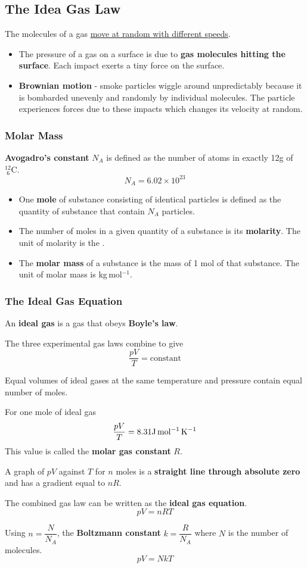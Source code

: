 \subsection{The Idea Gas Law}

The molecules of a gas \underline{move at random with different speeds}.
\begin{itemize}
    \item The pressure of a gas on a surface is due to \textbf{gas molecules hitting the surface}. Each impact exerts a tiny force on the surface.
    \item \textbf{Brownian motion} - smoke particles wiggle around unpredictably because it is bombarded unevenly and randomly by individual molecules. The particle experiences forces due to these impacts which changes its velocity at random.
\end{itemize}

\subsubsection*{Molar Mass}

\textbf{Avogadro's constant} $N_A$ is defined as the number of atoms in exactly 12g of $^{12}_{\hspace{4pt}6}\text{C}$.
$$N_A=6.02\times10^{23}$$

\begin{itemize}
    \item One \textbf{mole} of substance consisting of identical particles is defined as the quantity of substance that contain $N_A$ particles.
    \item The number of moles in a given quantity of a substance is its \textbf{molarity}. The unit of molarity is the .
    \item The \textbf{molar mass} of a substance is the mass of 1 mol of that substance. The unit of molar mass is kg\,mol$^{-1}$.
\end{itemize}

\subsubsection*{The Ideal Gas Equation}

An \textbf{ideal gas} is a gas that obeys \textbf{Boyle's law}.

The three experimental gas laws combine to give
$$\frac{pV}{T}=\text{constant}$$

Equal volumes of ideal gases at the same temperature and pressure contain equal number of moles.

For one mole of ideal gas
$$\frac{pV}{T}=8.31\text{J\,mol$^{-1}$\,K$^{-1}$}$$
This value is called the \textbf{molar gas constant} $R$.

A graph of $pV$ against $T$ for $n$ moles is a \textbf{straight line through absolute zero} and has a gradient equal to $nR$.

The combined gas law can be written as the \textbf{ideal gas equation}.
$$pV=nRT$$

Using $n=\dfrac{N}{N_A}$, the \textbf{Boltzmann constant} $k=\dfrac{R}{N_A}$ where $N$ is the number of molecules.
$$pV=NkT$$
